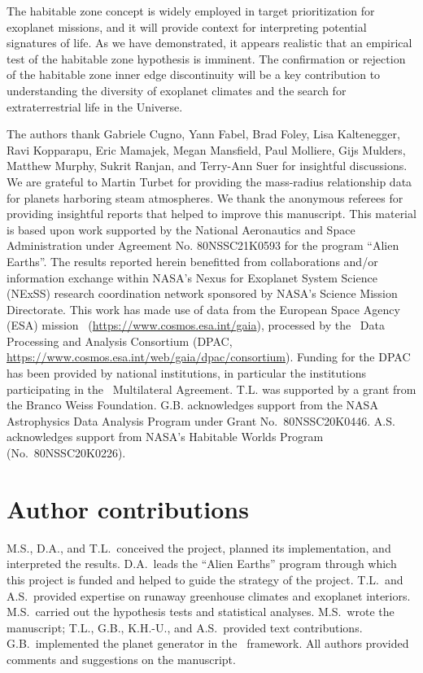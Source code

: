 \documentclass[twocolumn,twocolappendix,linenumbers]{aastex631}
\begin{document}
The habitable zone concept is widely employed in target prioritization for exoplanet missions, and it will provide context for interpreting potential signatures of life.
As we have demonstrated, it appears realistic that an empirical test of the habitable zone hypothesis is imminent.
The confirmation or rejection of the habitable zone inner edge discontinuity will be a key contribution to understanding the diversity of exoplanet climates and the search for extraterrestrial life in the Universe.

\begin{acknowledgments}
The authors thank Gabriele Cugno, Yann Fabel, Brad Foley, Lisa Kaltenegger, Ravi Kopparapu, Eric Mamajek, Megan Mansfield, Paul Molliere, Gijs Mulders, Matthew Murphy, Sukrit Ranjan, and Terry-Ann Suer for insightful discussions.
We are grateful to Martin Turbet for providing the mass-radius relationship data for planets harboring steam atmospheres.
We thank the anonymous referees for providing insightful reports that helped to improve this manuscript.
This material is based upon work supported by the National Aeronautics and Space Administration under Agreement No. 80NSSC21K0593 for the program ``Alien Earths''.
The results reported herein benefitted from collaborations and/or information exchange within NASA’s Nexus for Exoplanet System Science (NExSS) research coordination network sponsored by NASA’s Science Mission Directorate.
This work has made use of data from the European Space Agency (ESA) mission \gaia\ (\url{https://www.cosmos.esa.int/gaia}), processed by the \gaia\ Data Processing and Analysis Consortium (DPAC, \url{https://www.cosmos.esa.int/web/gaia/dpac/consortium}). Funding for the DPAC has been provided by national institutions, in particular the institutions participating in the \gaia\ Multilateral Agreement.
T.L. was supported by a grant from the Branco Weiss Foundation.
G.B. acknowledges support from the NASA Astrophysics Data Analysis Program under Grant No.~80NSSC20K0446.
A.S. acknowledges support from NASA's Habitable Worlds Program (No.~80NSSC20K0226).
\end{acknowledgments}

\section*{Author contributions}
M.S., D.A., and T.L.\ conceived the project, planned its implementation, and interpreted the results.
D.A.\ leads the ``Alien Earths'' program through which this project is funded and helped to guide the strategy of the project.
T.L.\ and A.S.\ provided expertise on runaway greenhouse climates and exoplanet interiors.
M.S.\ carried out the hypothesis tests and statistical analyses.
M.S.\ wrote the manuscript; T.L., G.B., K.H.-U., and A.S.\ provided text contributions.
G.B.\ implemented the planet generator in the \bioverse\ framework.
All authors provided comments and suggestions on the manuscript.
\end{document}
